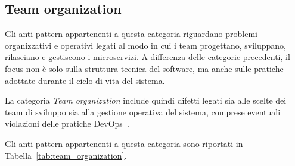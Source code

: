 \subsection{Team organization}

Gli anti-pattern appartenenti a questa categoria riguardano problemi organizzativi e operativi legati al modo in cui i team progettano, sviluppano, rilasciano e gestiscono i microservizi. A differenza delle categorie precedenti, il focus non è solo sulla struttura tecnica del software, ma anche sulle pratiche adottate durante il ciclo di vita del sistema.

La categoria \textit{Team organization} include quindi difetti legati sia alle scelte dei team di sviluppo sia alla gestione operativa del sistema, comprese eventuali violazioni delle pratiche DevOps~\cite{CernyCatalogo}.

Gli anti-pattern appartenenti a questa categoria sono riportati in Tabella~\ref{tab:team_organization}.

